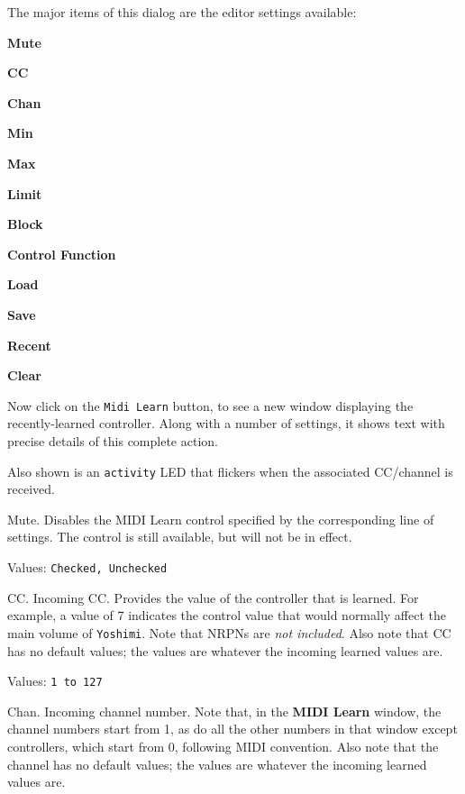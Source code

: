    The major items of this dialog are the editor settings available:

   \begin{enumber}
      \item \textbf{Mute}
      \item \textbf{CC}
      \item \textbf{Chan}
      \item \textbf{Min}
      \item \textbf{Max}
      \item \textbf{Limit}
      \item \textbf{Block}
      \item \textbf{Control Function}
      \item \textbf{Load}
      \item \textbf{Save}
      \item \textbf{Recent}
      \item \textbf{Clear}
   \end{enumber}

   Now click on the \texttt{Midi Learn} button, to see a new window displaying
   the recently-learned controller. Along with a number of settings, it shows
   text with precise details of this complete action.

   Also shown is an \texttt{activity} LED that flickers when the associated
   CC/channel is received.

   \setcounter{ItemCounter}{0}      %

   Mute.
   Disables the MIDI Learn control specified by the corresponding line of
   settings.  The control is still available, but will not be in effect.

   Values: \texttt{Checked, Unchecked}

   CC.
   Incoming CC.
   Provides the value of the controller that is learned.
   For example, a value of 7 indicates the control value that would normally
   affect the main volume of \texttt{Yoshimi}.
   Note that NRPNs are \textsl{not included}.
   Also note that CC has no default values; the values are whatever the
   incoming learned values are.

   Values: \texttt{1 to 127}

   Chan.
   Incoming channel number.
   Note that, in the \textbf{MIDI Learn} window, the channel numbers start
   from 1,  as do all the other numbers in that window except controllers, which
   start from 0, following MIDI convention.
   Also note that the channel has no default values; the values are whatever the
   incoming learned values are.

